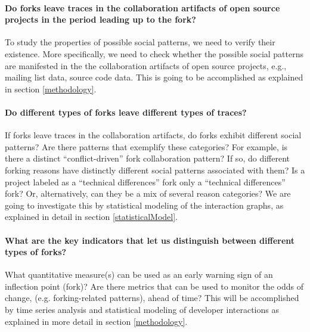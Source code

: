 \documentclass[12pt]{report}
\begin{document}
\paragraph*{\hspace{4 mm} Do forks leave traces in the collaboration artifacts of open source projects in the period leading up to the fork?\\}

To study the properties of possible social patterns, we need to verify their existence. More specifically, we need to check whether the possible social patterns are manifested in the the collaboration artifacts of open source projects, e.g., mailing list data, source code data. This is going to be accomplished as explained in section \ref{methodology}.

\paragraph*{\hspace{4 mm} Do different types of forks leave different types of traces?\\}

If forks leave traces in the collaboration artifacts, do forks exhibit different social patterns? Are there patterns that exemplify these categories? For example, is there a distinct ``conflict-driven'' fork collaboration pattern? If so, do different forking reasons have distinctly different social patterns associated with them? Is a project labeled as a ``technical differences'' fork only a ``technical differences'' fork? Or, alternatively, can they be a mix of several reason categories? We are going to investigate this by statistical modeling of the interaction graphs, as explained in detail in section \ref{statisticalModel}.

\paragraph*{\hspace{4 mm} What are the key indicators that let us distinguish between different types of forks?\\}

What quantitative measure(s) can be used as an early warning sign of an inflection point (fork)? Are there metrics that can be used to monitor the odds of change, (e.g. forking-related patterns), ahead of time? This will be accomplished by time series analysis and statistical modeling of developer interactions as explained in more detail in section \ref{methodology}.\\
\end{document}
